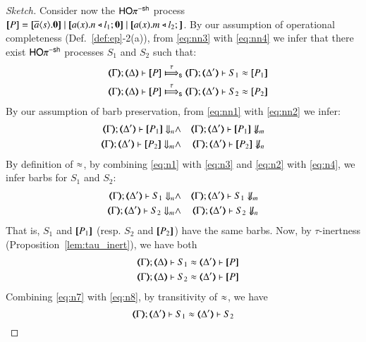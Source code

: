 \begin{proof}[Sketch]
Consider now the $\mathsf{HO}\pi^{\mathsf{-sh}}$ process $\map{P} = 
 \map{\breq{a}{s} \inact} \Par \map{\bacc{a}{x} \bsel{n}{l_1} \inact} \Par \map{\bacc{a}{x} \bsel{m}{l_2}}$.
By our assumption of operational completeness 
(Def.~\ref{def:ep}-2(a)), 
from \eqref{eq:nn3} with \eqref{eq:nn4}
we infer that
there exist $\mathsf{HO}\pi^{\mathsf{-sh}}$ processes $S_1$ and $S_2$ such that:
\begin{eqnarray}
& & \shwtytra{\mapt{\Gamma}}{\tau}{\mapt{\Delta}}{\map{P}}{\mapt{\Delta'}}{S_1 \wb \map{P_1}} \label{eq:n1} \\
& & \shwtytra{\mapt{\Gamma}}{\tau}{\mapt{\Delta}}{\map{P}}{\mapt{\Delta'}}{S_2 \wb \map{P_2}} \label{eq:n2}
\end{eqnarray}
By our assumption of barb preservation, 
from \eqref{eq:nn1} with \eqref{eq:nn2}
we infer: 
\begin{eqnarray}
\mapt{\Gamma}; \mapt{\Delta'} \proves \map{P_1} \Barb{n} & \land & 
\mapt{\Gamma}; \mapt{\Delta'} \proves \map{P_1} \nBarb{m} \label{eq:n3} \\
\mapt{\Gamma}; \mapt{\Delta'} \proves \map{P_2} \Barb{m} & \land & 
\mapt{\Gamma}; \mapt{\Delta'} \proves \map{P_2} \nBarb{n} \label{eq:n4}
\end{eqnarray}
By definition of $\approx$, 
by combining 
\eqref{eq:n1} with \eqref{eq:n3}
and
\eqref{eq:n2} with \eqref{eq:n4}, we infer barbs for $S_1$ and $S_2$:
\begin{eqnarray}
\mapt{\Gamma}; \mapt{\Delta'} \proves S_1 \Barb{n} & \land & 
\mapt{\Gamma}; \mapt{\Delta'} \proves S_1 \nBarb{m} \label{eq:n5} \\
\mapt{\Gamma}; \mapt{\Delta'} \proves S_2 \Barb{m} & \land & 
\mapt{\Gamma}; \mapt{\Delta'} \proves S_2 \nBarb{n} \label{eq:n6}
\end{eqnarray}
That is, $S_1$ and $[\!\![P_1]\!\!]$ 
(resp. $S_2$ and $[\!\![P_2]\!\!]$)
 have the same barbs.
Now, by $\tau$-inertness (Proposition~\ref{lem:tau_inert}), we have both 
\begin{eqnarray}
& & \horel{\mapt{\Gamma}}{\mapt{\Delta}}{S_1}{\wb}{\mapt{\Delta'}}{\map{P}} \label{eq:n7} \\
& & \horel{\mapt{\Gamma}}{\mapt{\Delta}}{S_2}{\wb}{\mapt{\Delta'}}{\map{P}} \label{eq:n8}
\end{eqnarray}
Combining \eqref{eq:n7} with \eqref{eq:n8}, by transitivity of $\approx$,
we have 
\begin{equation}
\horel{\mapt{\Gamma}}{\mapt{\Delta'}}{S_1}{\wb}{\mapt{\Delta'}}{S_2} \label{eq:n9}

\end{equation}
\end{proof}
